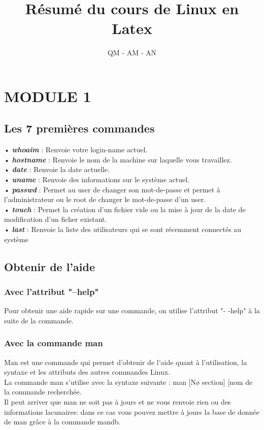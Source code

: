 \documentclass[a4paper, 12pt, french]{book}
\title{\textbf{{\LARGE Résumé du cours de Linux en Latex}}}
\author{QM - AM - AN}
\begin{document}
   \maketitle
   \tableofcontents
   \frontmatter
   \mainmatter
   \chapter{MODULE 1}
      \section{\Large  Les 7 premières commandes}
      
      
     \begin{flushleft}
     • \textbf {\textit{whoaim}} : Renvoie votre login-name actuel.\\
     • \textbf {\textit{hostname}} : Renvoie le nom de la machine sur laquelle vous travaillez.\\
     • \textbf {\textit{date}} : Renvoie la date actuelle.\\
     • \textbf {\textit{uname}} : Renvoie des informations sur le système actuel.\\
     • \textbf{\textit{passwd}} : Permet au user de changer son mot-de-passe et permet à l’administrateur ou le root de changer le mot-de-passe d’un user.\\
     • \textbf{\textit{touch}} : Permet la création d’un fichier vide ou la mise à jour de la date de modification d’un ficher existant.\\
     • \textbf{\textit{last}} : Renvoie la liste des utilisateurs qui se sont récemment connectés au système\\
     \end{flushleft}
     
       
\section{\Large Obtenir de l’aide }
		\subsection{Avec l’attribut "--help"}
	Pour obtenir une aide rapide sur une commande, on utilise l’attribut "- -help" à la suite de la commande.
		\subsection{Avec la commande man} 
 Man est une commande qui permet d’obtenir de l’aide quant à l’utilisation,
la syntaxe et les attributs des autres commandes Linux.\\
La commande man s’utilise avec la syntaxe suivante : man [Nø section] [nom de la commande recherchée.\\
Il peut arriver que man ne soit pas à jours et ne vous renvoie rien ou des
informations lacunaires: dans ce cas vous pouvez mettre à jours la base de donnée de man
grâce à la commande mandb.
\end{document}
